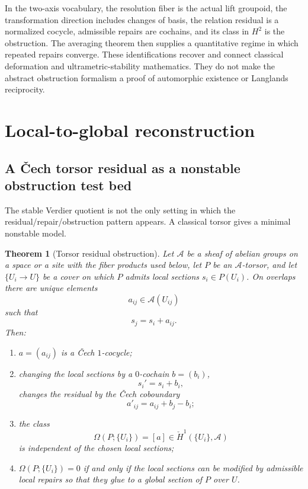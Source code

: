 \documentclass[11pt]{article}
\newtheorem{theorem}{Theorem}[section]
\theoremstyle{definition}
\theoremstyle{remark}
\begin{document}
In the two-axis vocabulary, the resolution fiber is the actual lift groupoid, the transformation direction includes changes of basis, the relation residual is a normalized cocycle, admissible repairs are cochains, and its class in $H^2$ is the obstruction. The averaging theorem then supplies a quantitative regime in which repeated repairs converge. These identifications recover and connect classical deformation and ultrametric-stability mathematics. They do not make the abstract obstruction formalism a proof of automorphic existence or Langlands reciprocity.


\section{Local-to-global reconstruction}

\subsection{A \v{C}ech torsor residual as a nonstable obstruction test bed}

The stable Verdier quotient is not the only setting in which the residual/repair/obstruction pattern appears. A classical torsor gives a minimal nonstable model.

\begin{theorem}[Torsor residual obstruction]\label{thm:torsor-obstruction}
Let $\mathcal A$ be a sheaf of abelian groups on a space or a site with the fiber products used below, let $P$ be an $\mathcal A$-torsor, and let $\{U_i\to U\}$ be a cover on which $P$ admits local sections $s_i\in P(U_i)$. On overlaps there are unique elements
\[
a_{ij}\in\mathcal A(U_{ij})
\]
such that
\[
s_j=s_i+a_{ij}.
\]
Then:
\begin{enumerate}
    \item $a=(a_{ij})$ is a \v{C}ech $1$-cocycle;
    \item changing the local sections by a $0$-cochain $b=(b_i)$,
    \[
    s_i'=s_i+b_i,
    \]
    changes the residual by the \v{C}ech coboundary
    \[
    a'_{ij}=a_{ij}+b_j-b_i;
    \]
    \item the class
    \[
    \Omega(P;\{U_i\})=[a]\in\check H^1(\{U_i\},\mathcal A)
    \]
    is independent of the chosen local sections;
    \item $\Omega(P;\{U_i\})=0$ if and only if the local sections can be modified by admissible local repairs so that they glue to a global section of $P$ over $U$.
\end{enumerate}
\end{theorem}
\end{document}
